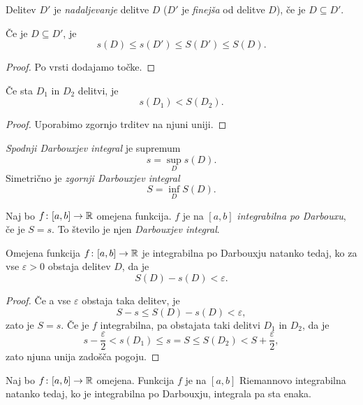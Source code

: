 \documentclass[12pt, a4paper]{article}
\begin{document}
\begin{definicija}
Delitev $D'$ je \emph{nadaljevanje} delitve $D$ ($D'$ je \emph{finejša} od delitve $D$), če je $D\subseteq D'$.
\end{definicija}

\begin{trditev}
Če je $D\subseteq D'$, je
\[
s(D)\leq s(D')\leq S(D')\leq S(D).
\]
\end{trditev}

\begin{proof}
Po vrsti dodajamo točke.
\end{proof}

\begin{posledica}
Če sta $D_1$ in $D_2$ delitvi, je
\[
s(D_1)<S(D_2).
\]
\end{posledica}

\begin{proof}
Uporabimo zgornjo trditev na njuni uniji.
\end{proof}

\begin{definicija}
\emph{Spodnji Darbouxjev integral} je supremum
\[
s=\sup_D s(D).
\]
Simetrično je \emph{zgornji Darbouxjev integral}
\[
S=\inf_D S(D).
\]
\end{definicija}

\begin{okvir}
\begin{definicija}
Naj bo $f\colon[a,b]\to\mathbb{R}$ omejena funkcija. $f$ je na $[a,b]$ \emph{integrabilna po Darbouxu}, če je $S=s$. To število je njen \emph{Darbouxjev integral}.
\end{definicija}
\end{okvir}

\begin{trditev}
Omejena funkcija $f\colon[a,b]\to\mathbb{R}$ je integrabilna po Darbouxju natanko tedaj, ko za vse $\varepsilon>0$ obstaja delitev $D$, da je
\[
S(D)-s(D)<\varepsilon.
\]
\end{trditev}

\begin{proof}
Če a vse $\varepsilon$ obstaja taka delitev, je
\[
S-s\leq S(D)-s(D)<\varepsilon,
\]
zato je $S=s$. Če je $f$ integrabilna, pa obstajata taki delitvi $D_1$ in $D_2$, da je
\[
s-\frac{\varepsilon}{2}<s(D_1)\leq s=S\leq S(D_2)<S+\frac{\varepsilon}{2},
\]
zato njuna unija zadošča pogoju.
\end{proof}

\begin{izrek}
Naj bo $f\colon[a,b]\to\mathbb{R}$ omejena. Funkcija $f$ je na $[a,b]$ Riemannovo integrabilna natanko tedaj, ko je integrabilna po Darbouxju, integrala pa sta enaka.
\end{izrek}
\end{document}
